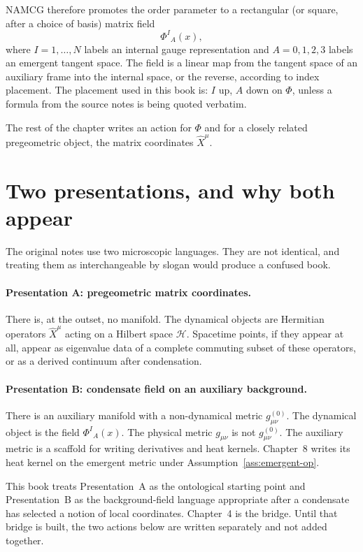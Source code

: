 NAMCG therefore promotes the order parameter to a rectangular (or
square, after a choice of basis) matrix field
\begin{equation}
  \label{eq:Phi-field}
  \Phi^I{}_A(x),
\end{equation}
where \(I=1,\ldots,N\) labels an internal gauge representation and
\(A=0,1,2,3\) labels an emergent tangent space. The field is a
linear map from the tangent space of an auxiliary frame into the
internal space, or the reverse, according to index placement. The
placement used in this book is: \(I\) up, \(A\) down on \(\Phi\),
unless a formula from the source notes is being quoted verbatim.

The rest of the chapter writes an action for \(\Phi\) and for a
closely related pregeometric object, the matrix coordinates
\(\hat X^\mu\).

\section{Two presentations, and why both appear}
\label{sec:ch3-two-presentations}

The original notes use two microscopic languages. They are not
identical, and treating them as interchangeable by slogan would
produce a confused book.

\paragraph{Presentation A: pregeometric matrix coordinates.}
There is, at the outset, no manifold. The dynamical objects are
Hermitian operators \(\hat X^\mu\) acting on a Hilbert space
\(\mathcal{H}\). Spacetime points, if they appear at all, appear as
eigenvalue data of a complete commuting subset of these operators, or
as a derived continuum after condensation.

\paragraph{Presentation B: condensate field on an auxiliary background.}
There is an auxiliary manifold with a non-dynamical metric
\(g^{(0)}_{\mu\nu}\). The dynamical object is the field
\(\Phi^I{}_A(x)\). The physical metric \(g_{\mu\nu}\) is not
\(g^{(0)}_{\mu\nu}\). The auxiliary metric is a scaffold for writing
derivatives and heat kernels. Chapter~8 writes its heat kernel on the emergent metric under
Assumption~\ref{ass:emergent-op}.

This book treats Presentation~A as the ontological starting point and
Presentation~B as the background-field language appropriate after a
condensate has selected a notion of local coordinates. Chapter~4 is
the bridge. Until that bridge is built, the two actions below are
written separately and not added together.

